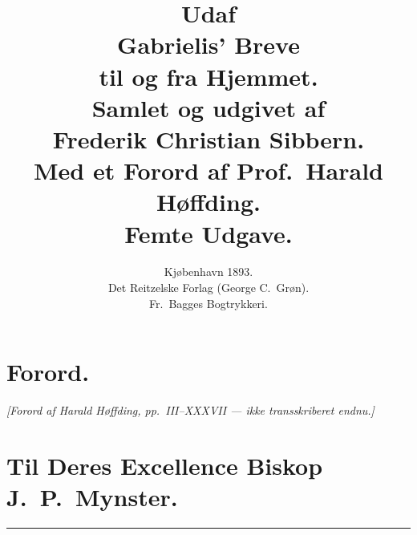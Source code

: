 \documentclass[12pt,a4paper]{book}
\title{\Huge\textbf{Udaf}\\[6pt]
  \Huge\textbf{Gabrielis' Breve}\\[8pt]
  \large \textbf{til og fra Hjemmet.}\\[14pt]
  \normalsize Samlet og udgivet af\\[4pt]
  \large Frederik Christian Sibbern.\\[10pt]
  \normalsize Med et Forord af Prof.\ Harald Høffding.\\[10pt]
  \normalsize Femte Udgave.}
\author{}
\date{Kjøbenhavn 1893.\\
  Det Reitzelske Forlag (George C.\ Grøn).\\
  Fr.\ Bagges Bogtrykkeri.}
\begin{document}
\maketitle
\thispagestyle{empty}
\cleardoublepage

\chapter*{Forord.}

\begin{center}\textit{[Forord af Harald Høffding, pp.~III--XXXVII --- ikke transskriberet endnu.]}\end{center}

\cleardoublepage

\chapter*{Til Deres Excellence Biskop J.\ P.\ Mynster.}

\begin{center}\rule{0.28\linewidth}{0.4pt}\end{center}
\end{document}
